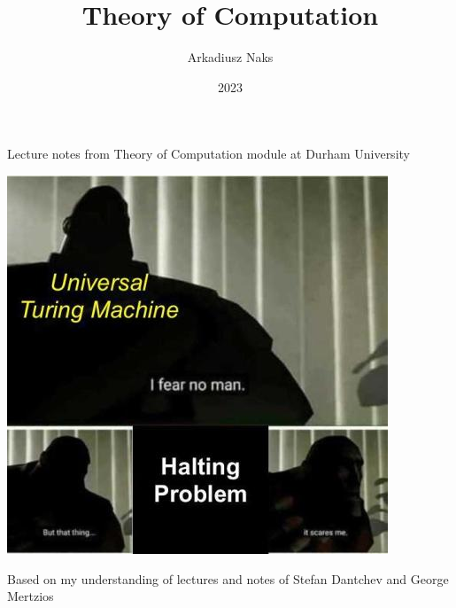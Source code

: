 \documentclass[12pt, letterpaper]{article}
\title{Theory of Computation}
\author{Arkadiusz Naks}
\date{2023}
\begin{document}
\begin{titlepage}
  \begin{center}
    \makeatletter
    \vspace*{1cm}
    \Huge
    \textbf{\@title}

    \vspace{0.5cm}
    \Large
    Lecture notes from Theory of Computation module at Durham University

    \vspace{1.5cm}

    \textbf{\@author}

    \includegraphics[scale=0.55]{toc.png}
    \vfill

    \vspace{0.8cm}

    \small
    Based on my understanding of lectures and notes of Stefan Dantchev and George Mertzios\\
    \@date{}
  \end{center}
\end{titlepage}

\tableofcontents
\newpage
\end{document}
